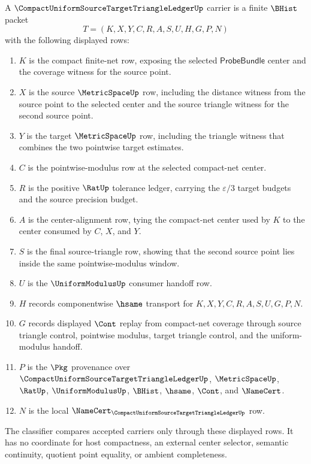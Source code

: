 \begin{definition}
\label{def:compact-uniform-source-target-triangle-ledger-carrier}
A $\CompactUniformSourceTargetTriangleLedgerUp$ carrier is a finite $\BHist$
packet
$$
T=(K,X,Y,C,R,A,S,U,H,G,P,N)
$$
with the following displayed rows:
\begin{enumerate}
\item $K$ is the compact finite-net row, exposing the selected
$\mathsf{ProbeBundle}$ center and the coverage witness for the source point.
\item $X$ is the source $\MetricSpaceUp$ row, including the distance witness
from the source point to the selected center and the source triangle witness
for the second source point.
\item $Y$ is the target $\MetricSpaceUp$ row, including the triangle witness
that combines the two pointwise target estimates.
\item $C$ is the pointwise-modulus row at the selected compact-net center.
\item $R$ is the positive $\RatUp$ tolerance ledger, carrying the
$\varepsilon/3$ target budgets and the source precision budget.
\item $A$ is the center-alignment row, tying the compact-net center used by
$K$ to the center consumed by $C$, $X$, and $Y$.
\item $S$ is the final source-triangle row, showing that the second source
point lies inside the same pointwise-modulus window.
\item $U$ is the $\UniformModulusUp$ consumer handoff row.
\item $H$ records componentwise $\hsame$ transport for $K,X,Y,C,R,A,S,U,G,P,N$.
\item $G$ records displayed $\Cont$ replay from compact-net coverage through
source triangle control, pointwise modulus, target triangle control, and the
uniform-modulus handoff.
\item $P$ is the $\Pkg$ provenance over
$\CompactUniformSourceTargetTriangleLedgerUp$, $\MetricSpaceUp$, $\RatUp$,
$\UniformModulusUp$, $\BHist$, $\hsame$, $\Cont$, and $\NameCert$.
\item $N$ is the local
$\NameCert_{\CompactUniformSourceTargetTriangleLedgerUp}$ row.
\end{enumerate}
The classifier compares accepted carriers only through these displayed rows. It
has no coordinate for host compactness, an external center selector, semantic
continuity, quotient point equality, or ambient completeness.
\end{definition}

